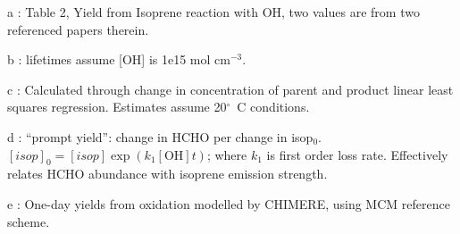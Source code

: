 \begin{table}
\begin{threeparttable}
\begin{tabular}{  l  l  l  l  }
            \bottomrule
          \end{tabular}
          \begin{tablenotes} %
            \item a \textcite{AtkinsonArey2003}: Table 2, Yield from Isoprene reaction with OH, two values are from two referenced papers therein.
            \item b \textcite{Palmer2003}: lifetimes assume [OH] is 1e15 mol cm$^{-3}$.
            \item c \parencite{Lee2006}: Calculated through change in concentration of parent and product linear least squares regression.
            Estimates assume 20$^\circ$~C conditions.
            \item d \textcite{Wolfe2016}: ``prompt yield'': change in HCHO per change in isop$_0$.
            $[isop]_0=[isop]\exp(k_1[\mathrm{OH}]t)$; where $k_1$ is first order loss rate.
            Effectively relates HCHO abundance with isoprene emission strength.
            \item e \textcite{Dufour2009}: One-day yields from oxidation modelled by CHIMERE, using MCM reference scheme.
          \end{tablenotes}
          \label{BioIsop:method:tab_VOCLiteratureYields}
        \end{threeparttable} \end{table}
      
